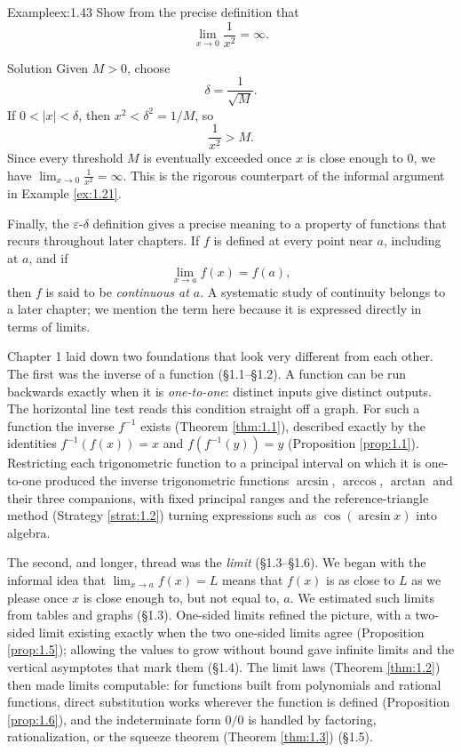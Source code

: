 \documentclass[a4paper,12pt,oneside]{memoir}
\begin{document}
\begin{workedexample}
\begin{envexample}{Example}{ex:1.43}{}
Show from the precise definition that \[ \lim_{x \to 0} \frac{1}{x^{2}} = \infty. \]
\end{envexample}
\begin{envsolution}{Solution}{}{}
Given \(M > 0\), choose \[ \delta = \frac{1}{\sqrt{M}}. \] If \(0 < |x| < \delta\), then \(x^{2} < \delta^{2} = 1/M\), so \[ \frac{1}{x^{2}} > M. \] Since every threshold \(M\) is eventually exceeded once \(x\) is close enough to \(0\), we have \(\lim_{x \to 0} \frac{1}{x^{2}} = \infty\). This is the rigorous counterpart of the informal argument in Example \ref{ex:1.21}.
\end{envsolution}
\end{workedexample}
Finally, the \(\varepsilon\)-\(\delta\) definition gives a precise meaning to a property of functions that recurs throughout later chapters. If \(f\) is defined at every point near \(a\), including at \(a\), and if \[ \lim_{x \to a} f(x) = f(a), \] then \(f\) is said to be \emph{continuous at \(a\)}. A systematic study of continuity belongs to a later chapter; we mention the term here because it is expressed directly in terms of limits.

Chapter 1 laid down two foundations that look very different from each other. The first was the inverse of a function (§1.1–§1.2). A function can be run backwards exactly when it is \emph{one-to-one}: distinct inputs give distinct outputs. The horizontal line test reads this condition straight off a graph. For such a function the inverse \(f^{-1}\) exists (Theorem \ref{thm:1.1}), described exactly by the identities \(f^{-1}(f(x)) = x\) and \(f(f^{-1}(y)) = y\) (Proposition \ref{prop:1.1}). Restricting each trigonometric function to a principal interval on which it is one-to-one produced the inverse trigonometric functions \(\arcsin\), \(\arccos\), \(\arctan\) and their three companions, with fixed principal ranges and the reference-triangle method (Strategy \ref{strat:1.2}) turning expressions such as \(\cos(\arcsin x)\) into algebra.

The second, and longer, thread was the \emph{limit} (§1.3–§1.6). We began with the informal idea that \(\lim_{x \to a} f(x) = L\) means that \(f(x)\) is as close to \(L\) as we please once \(x\) is close enough to, but not equal to, \(a\). We estimated such limits from tables and graphs (§1.3). One-sided limits refined the picture, with a two-sided limit existing exactly when the two one-sided limits agree (Proposition \ref{prop:1.5}); allowing the values to grow without bound gave infinite limits and the vertical asymptotes that mark them (§1.4). The limit laws (Theorem \ref{thm:1.2}) then made limits computable: for functions built from polynomials and rational functions, direct substitution works wherever the function is defined (Proposition \ref{prop:1.6}), and the indeterminate form \(0/0\) is handled by factoring, rationalization, or the squeeze theorem (Theorem \ref{thm:1.3}) (§1.5).
\end{document}
